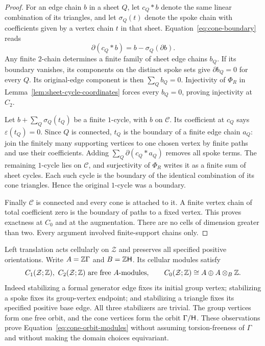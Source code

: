 \begin{proof}
For an edge chain $b$ in a sheet $Q$, let $c_Q*b$ denote the same
linear combination of its triangles, and let $\sigma_Q(t)$ denote
the spoke chain with coefficients given by a vertex chain $t$ in
that sheet.  Equation~\eqref{eq:cone-boundary} reads
\[
 \partial(c_Q*b)=b-\sigma_Q(\partial b).
\]
Any finite $2$-chain determines a finite family of sheet edge chains
$b_Q$.  If its boundary vanishes, its components on the distinct
spoke sets give $\partial b_Q=0$ for every $Q$.  Its original-edge
component is then $\sum_Q b_Q=0$.  Injectivity of
$\Phi_R$ in Lemma~\ref{lem:sheet-cycle-coordinates} forces every
$b_Q=0$, proving injectivity at $C_2$.

Let $b+\sum_Q\sigma_Q(t_Q)$ be a finite $1$-cycle, with $b$ on
$\mathcal C$.  Its coefficient at $c_Q$ says
$\varepsilon(t_Q)=0$.  Since $Q$ is connected, $t_Q$ is the boundary
of a finite edge chain $a_Q$: join the finitely many supporting
vertices to one chosen vertex by finite paths and use their
coefficients.  Adding $\sum_Q\partial(c_Q*a_Q)$ removes all spoke
terms.  The remaining $1$-cycle lies on $\mathcal C$, and
surjectivity of $\Phi_R$ writes it as a finite sum of sheet cycles.
Each such cycle is the boundary of the identical combination of
its cone triangles.  Hence the original $1$-cycle was a boundary.

Finally $\mathcal C$ is connected and every cone is attached to it.
A finite vertex chain of total coefficient zero is the boundary of
paths to a fixed vertex.  This proves exactness at $C_0$ and at
the augmentation.  There are no cells of dimension greater than two.
Every argument involved finite-support chains only.
\end{proof}

Left translation acts cellularly on $\mathcal Z$ and preserves all
specified positive orientations.  Write $A=\mathbb Z\Gamma$ and
$B=\mathbb Z\mathsf H$.  Its cellular modules satisfy
\begin{equation}
 C_1(\mathcal Z;\mathbb Z),\ C_2(\mathcal Z;\mathbb Z)
 \text{ are free }A\text{-modules},\qquad
 C_0(\mathcal Z;\mathbb Z)\cong A\oplus A\otimes_B\mathbb Z.
 \label{eq:cone-orbit-modules}
\end{equation}
Indeed stabilizing a formal generator edge fixes its initial group
vertex; stabilizing a spoke fixes its group-vertex endpoint; and
stabilizing a triangle fixes its specified positive base edge.
All three stabilizers are trivial.  The group vertices form one
free orbit, and the cone vertices form the orbit $\Gamma/\mathsf H$.
These observations prove Equation~\eqref{eq:cone-orbit-modules}
without assuming torsion-freeness of $\Gamma$ and without making
the domain choices equivariant.

